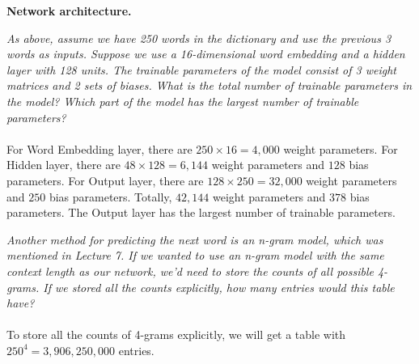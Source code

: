 \documentclass{myhw}
\begin{document}
\begin{homeworkProblem}
\textbf{Network architecture.}
\begin{homeworkSection} 
\emph{As above, assume we have 250 words in the dictionary and use the previous 3 words as inputs. Suppose we use a 16-dimensional word embedding and a hidden layer with 128 units. The trainable parameters of the model consist of 3 weight matrices and 2 sets of biases. What is the total number of trainable parameters in the model? Which part of the model has the largest number of trainable parameters?} \\
\\
For Word Embedding layer, there are $250 \times 16 = 4,000$ weight parameters. 
For Hidden layer, there are $48 \times 128 = 6,144$ weight parameters and $128$ bias parameters.
For Output layer, there are $128 \times 250 = 32,000$ weight parameters and $250$ bias parameters.
Totally, $42,144$ weight parameters and $378$ bias parameters. The Output layer has the largest number of trainable parameters.
\end{homeworkSection}
\begin{homeworkSection}
\emph{Another method for predicting the next word is an n-gram model, which was mentioned in Lecture 7. If we wanted to use an n-gram model with the same context length as our network, we’d need to store the counts of all possible 4-grams. If we stored all the counts explicitly, how many entries would this table have?} \\
\\
To store all the counts of 4-grams explicitly, we will get a table with $250^4 = 3,906,250,000$ entries. 
\end{homeworkSection}
\end{homeworkProblem}
\end{document}
